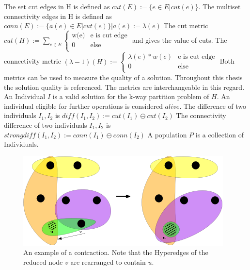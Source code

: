 \documentclass[a4paper,12pt,bibtotoc,titlepage, liststotoc,BCOR7mm,headsepline,pointlessnumbers]{scrbook}
\numberwithin{equation}{section}
\begin{document}
The set cut edges in H is defined as
$cut(E) := \{e \in E | cut(e) \}$.
The multiset connectivity edges in H is defined as
$conn(E) := \{a(e) \in E | cut(e) \} |a(e) := \lambda(e)$
The cut metric $cut(H) := \sum_{e \in E} 
\begin{cases}
       \text{w(e)} & \text{e is cut edge}\\
       \text{0} &\text{else}\\
     \end{cases}$  and gives the value of cuts.
The connectivity metric $(\lambda -1)(H) := \begin{cases}
       \text{$\lambda(e)*w(e)$} & \text{e is cut edge}\\
       \text{0} &\text{else}\\
     \end{cases}$
Both metrics can be used to measure the quality of a solution. Throughout this thesis the solution quality is referenced. The metrics are interchangeable in this regard.
An Individual $I$ is a valid solution for the k-way partition problem of $H$.
An individual eligible for further operations is considered $alive$.
The difference of two individuals $I_1, I_2$ is $diff(I_1, I_2) := cut(I_1) \ominus cut(I_2)$
The connectivity difference of two individuals $I_1, I_2$ is $strongdiff(I_1, I_2) := conn(I_1) \ominus conn(I_2)$
A population $P$ is a collection of Individuals.

\begin{figure}[t!] 
    \vspace*{-.25cm}
  \centering
   \includegraphics[width=.8\textwidth]{Ipe/img.png} %
  \caption{An example of a contraction. Note that the Hyperedges of the reduced node $v$ are rearranged to contain $u$.}\label{fig:img.png}
    \vspace*{-.5cm}
\end{figure}


\end{document}

